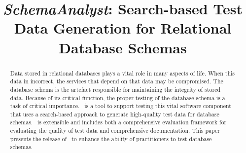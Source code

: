\documentclass[conference]{IEEEtran}
\begin{document}
\title{\textit{SchemaAnalyst}: Search-based Test Data Generation for Relational Database Schemas}

\author{
\and
{}
}
\maketitle

\begin{abstract}

Data stored in relational databases plays a vital role in many aspects of life.  When this data in incorrect, the
services that depend on that data may be compromised.  The database schema is the artefact responsible for maintaining
the integrity of stored data. Because of its critical function, the proper testing of the database schema is a task of
critical importance. \sa~is a tool to support testing this vital software component that uses a search-based approach to
generate high-quality test data for database schemas. \sa~is extensible and includes both a comprehensive evaluation
framework for evaluating the quality of test data and comprehensive documentation. This paper presents the release of
\sa~to enhance the ability of practitioners to test database schemas.

\end{abstract}

\vspace*{-.05in}










\end{document}
